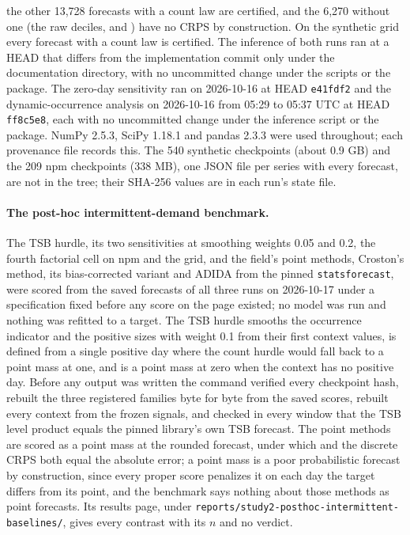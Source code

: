 the other 13,728 forecasts with a count law are certified, and the 6,270 without one (the raw deciles,
\lm{} and \aets{}) have no CRPS by construction. On the synthetic grid every forecast with a count law is
certified. The inference of both runs ran at a HEAD that differs from the implementation commit only under
the documentation directory, with no uncommitted change under the scripts or the package. The zero-day
sensitivity ran on 2026-10-16 at HEAD \texttt{e41fdf2} and the dynamic-occurrence analysis on 2026-10-16
from 05:29 to 05:37 UTC at HEAD \texttt{ff8c5e8}, each with no uncommitted change under the inference
script or the package. NumPy 2.5.3, SciPy 1.18.1 and pandas 2.3.3 were used throughout; each provenance
file records this. The 540 synthetic checkpoints (about 0.9 GB) and the 209 npm checkpoints (338 MB), one
JSON file per series with every forecast, are not in the tree; their SHA-256 values are in each run's state
file.

\paragraph{The post-hoc intermittent-demand benchmark.} The TSB hurdle, its two sensitivities at smoothing
weights 0.05 and 0.2, the fourth factorial cell on npm and the grid, and the field's point methods, Croston's
method, its bias-corrected variant and ADIDA from the pinned \texttt{statsforecast}, were scored from the
saved forecasts of all three runs on 2026-10-17 under a specification fixed before any score on the page
existed; no model was run and nothing was refitted to a target. The TSB hurdle smooths the occurrence
indicator and the positive sizes with weight 0.1 from their first context values, is defined from a single
positive day where the count hurdle would fall back to a point mass at one, and is a point mass at zero when
the context has no positive day. Before any output was written the command
verified every checkpoint hash, rebuilt the three registered families byte for byte from the saved scores,
rebuilt every context from the frozen signals, and checked in every window that the TSB level product equals
the pinned library's own TSB forecast. The point methods are scored as a point mass at the rounded forecast,
under which \qs{} and the discrete CRPS both equal the absolute error; a point mass is a poor probabilistic
forecast by construction, since every proper score penalizes it on each day the target differs from its
point, and the benchmark says nothing about those methods as point forecasts. Its
results page, under \texttt{reports/study2-posthoc-intermittent-baselines/}, gives every contrast with its
$n$ and no verdict.

